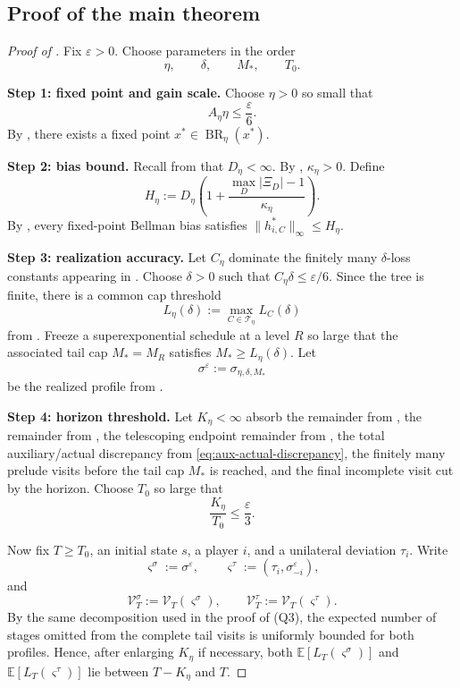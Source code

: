 \documentclass[12pt]{article}
\theoremstyle{definition}
\newcommand{\eps}{\varepsilon}
\newcommand{\E}{\mathbb{E}}
\newcommand{\1}{\mathbf{1}}
\newcommand{\cT}{\mathcal{T}}
\DeclareMathOperator{\BR}{BR}
\begin{document}
\subsection{Proof of the main theorem}


\begin{proof}[Proof of ]
Fix $\eps>0$. Choose parameters in the order
\[
\eta,\qquad \delta,\qquad M_*,\qquad T_0.
\]

\smallskip
\noindent\textbf{Step 1: fixed point and gain scale.}
Choose $\eta>0$ so small that
\[
A_\eta\eta\le \frac{\eps}{6}.
\]
By , there exists a fixed point $x^*\in\BR_\eta(x^*)$.

\smallskip
\noindent\textbf{Step 2: bias bound.}
Recall from  that $D_\eta<\infty$. By
, $\kappa_\eta>0$. Define
\[
H_\eta:=D_\eta\left(1+\frac{\max_D|\Xi_D|-1}{\kappa_\eta}\right).
\]
By , every fixed-point Bellman bias satisfies
$\|h_{i,C}^*\|_\infty\le H_\eta$.

\smallskip
\noindent\textbf{Step 3: realization accuracy.}
Let $C_\eta$ dominate the finitely many $\delta$-loss constants appearing in
. Choose
$\delta>0$ such that $C_\eta\delta\le \eps/6$. Since the tree is finite, there
is a common cap threshold
\[
L_\eta(\delta):=\max_{C\in\cT_\eta}L_C(\delta)
\]
from . Freeze a superexponential schedule at a level
$R$ so large that the associated tail cap $M_*=M_R$ satisfies
$M_*\ge L_\eta(\delta)$. Let
\[
\sigma^\eps:=\sigma_{\eta,\delta,M_*}
\]
be the realized profile from .

\smallskip
\noindent\textbf{Step 4: horizon threshold.}
Let $K_\eta<\infty$ absorb the remainder from , the
remainder from , the telescoping endpoint remainder
from , the total auxiliary/actual discrepancy from
\eqref{eq:aux-actual-discrepancy}, the finitely many prelude visits before the
tail cap $M_*$ is reached, and the final incomplete visit cut by the horizon.
Choose $T_0$ so large that
\[
\frac{K_\eta}{T_0}\le \frac{\eps}{3}.
\]

Now fix $T\ge T_0$, an initial state $s$, a player $i$, and a unilateral
deviation $\tau_i$. Write
\[
\varsigma^\sigma:=\sigma^\eps,
\qquad
\varsigma^\tau:=(\tau_i,\sigma^\eps_{-i}),
\]
and
\[
\mathcal V_T^\sigma:=\mathcal V_T(\varsigma^\sigma),
\qquad
\mathcal V_T^\tau:=\mathcal V_T(\varsigma^\tau).
\]
By the same decomposition used in the proof of
\textnormal{(Q3)}, the expected number of stages omitted
from the complete tail visits is uniformly bounded for both profiles. Hence,
after enlarging $K_\eta$ if necessary, both
$\E[L_T(\varsigma^\sigma)]$ and $\E[L_T(\varsigma^\tau)]$ lie between
$T-K_\eta$ and $T$.


\end{proof}
\end{document}
